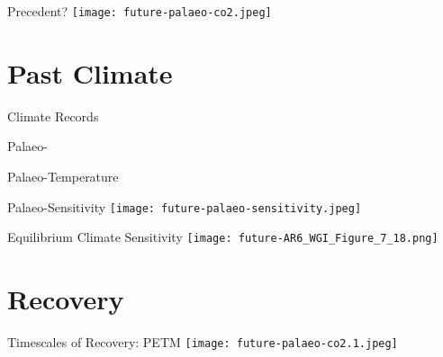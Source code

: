 \begin{frame}{Precedent?}
    \centering
    \texttt{[image: future-palaeo-co2.jpeg]}
\end{frame}            

\section{Past Climate}

\begin{frame}{Climate Records}
\end{frame}

\begin{frame}{Palaeo-}
\end{frame}

\begin{frame}{Palaeo-Temperature}
\end{frame}

\begin{frame}{Palaeo-Sensitivity}
    \texttt{[image: future-palaeo-sensitivity.jpeg]}
\end{frame}

\begin{frame}{Equilibrium Climate Sensitivity}
    \centering
    \texttt{[image: future-AR6\_WGI\_Figure\_7\_18.png]}

\end{frame}

\section{Recovery}

\begin{frame}{Timescales of Recovery: PETM}
    \centering
    \texttt{[image: future-palaeo-co2.1.jpeg]}
\end{frame}

